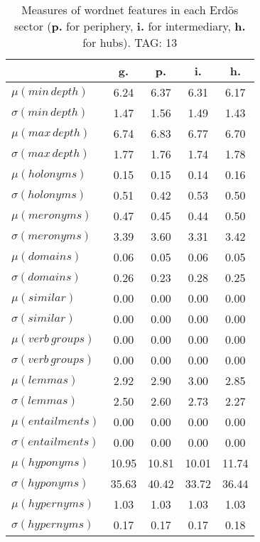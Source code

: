 \begin{table}[h!]
\begin{center}
\begin{tabular}{| l || c | c | c | c |}\hline
 & {\bf g.} & {\bf p.} & {\bf i.} & {\bf h.} \\\hline\hline
$\mu(min\,depth)$ & 6.24  & 6.37  & 6.31  & 6.17 \\
$\sigma(min\,depth)$ & 1.47  & 1.56  & 1.49  & 1.43 \\\hline
$\mu(max\,depth)$ & 6.74  & 6.83  & 6.77  & 6.70 \\
$\sigma(max\,depth)$ & 1.77  & 1.76  & 1.74  & 1.78 \\\hline
$\mu(holonyms)$ & 0.15  & 0.15  & 0.14  & 0.16 \\
$\sigma(holonyms)$ & 0.51  & 0.42  & 0.53  & 0.50 \\\hline
$\mu(meronyms)$ & 0.47  & 0.45  & 0.44  & 0.50 \\
$\sigma(meronyms)$ & 3.39  & 3.60  & 3.31  & 3.42 \\\hline
$\mu(domains)$ & 0.06  & 0.05  & 0.06  & 0.05 \\
$\sigma(domains)$ & 0.26  & 0.23  & 0.28  & 0.25 \\\hline
$\mu(similar)$ & 0.00  & 0.00  & 0.00  & 0.00 \\
$\sigma(similar)$ & 0.00  & 0.00  & 0.00  & 0.00 \\\hline
$\mu(verb\,groups)$ & 0.00  & 0.00  & 0.00  & 0.00 \\
$\sigma(verb\,groups)$ & 0.00  & 0.00  & 0.00  & 0.00 \\\hline
$\mu(lemmas)$ & 2.92  & 2.90  & 3.00  & 2.85 \\
$\sigma(lemmas)$ & 2.50  & 2.60  & 2.73  & 2.27 \\\hline
$\mu(entailments)$ & 0.00  & 0.00  & 0.00  & 0.00 \\
$\sigma(entailments)$ & 0.00  & 0.00  & 0.00  & 0.00 \\\hline
$\mu(hyponyms)$ & 10.95  & 10.81  & 10.01  & 11.74 \\
$\sigma(hyponyms)$ & 35.63  & 40.42  & 33.72  & 36.44 \\\hline
$\mu(hypernyms)$ & 1.03  & 1.03  & 1.03  & 1.03 \\
$\sigma(hypernyms)$ & 0.17  & 0.17  & 0.17  & 0.18 \\\hline
\end{tabular}
\caption{Measures of wordnet features in each Erd\"os sector ({{\bf p.}} for periphery, {{\bf i.}} for intermediary, {{\bf h.}} for hubs). TAG: 13}
\end{center}
\end{table}